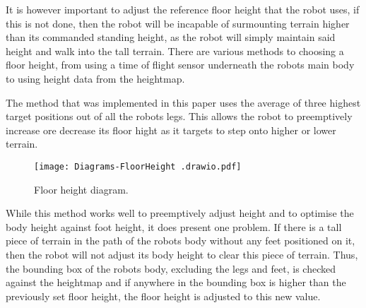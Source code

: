     It is however important to adjust the reference floor height that the robot uses, if this is not done, then the robot will be
    incapable of surmounting terrain higher than its commanded standing height, as the robot will simply maintain said height and walk into the tall terrain.
    There are various methods to choosing a floor height, from using 
    a time of flight sensor underneath the robots main body to using height data from the heightmap.

    The method that was implemented in this paper uses the average of three highest target positions out of all the robots legs.
    This allows the robot to preemptively increase ore decrease its floor hight as it targets to step onto higher or lower terrain.

    \begin{figure}[h]
        \centering
        \texttt{[image: Diagrams-FloorHeight .drawio.pdf]}
        \caption{Floor height diagram.}
        \label{fig:floor_height}
    \end{figure}

    While this method works well to preemptively adjust height and to optimise the body height against foot height, it does present one problem. If there is a tall piece of terrain in the path of the robots body
    without any feet positioned on it, then the robot will not adjust its body height to clear this piece of terrain. 
    Thus, the bounding box of the robots body, excluding the legs and feet, is checked against the heightmap
    and if anywhere in the bounding box is higher than the previously set floor height, the floor height is adjusted to this new value.